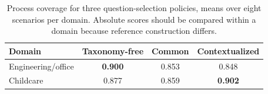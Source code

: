 \begin{table}[t]
\caption{Process coverage for three question-selection policies, means over
eight scenarios per domain. Absolute scores should be compared within a domain
because reference construction differs.}
\label{tab:question-policy}
\centering
\small
\begin{tabular}{lccc}
\toprule
Domain & Taxonomy-free & Common & Contextualized \\
\midrule
Engineering/office & \textbf{0.900} & 0.853 & 0.848 \\
Childcare & 0.877 & 0.859 & \textbf{0.902} \\
\bottomrule
\end{tabular}
\end{table}
